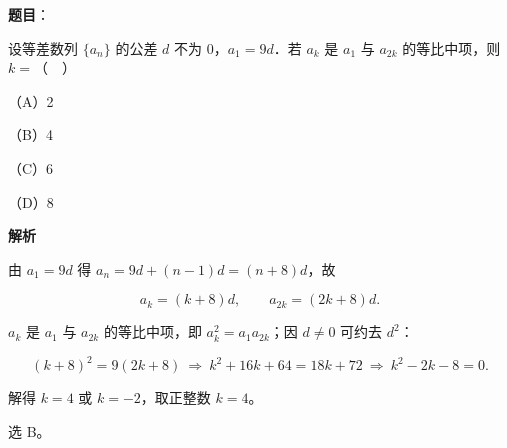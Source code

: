 \begin{answer}

\textbf{题目}：

设等差数列 $\{a_n\}$ 的公差 $d$ 不为 $0$，$a_1=9d$．若 $a_k$ 是 $a_1$ 与 $a_{2k}$ 的等比中项，则 $k=$（　）

（A）2

（B）4

（C）6

（D）8

\textbf{解析}

由 $a_1=9d$ 得 $a_n=9d+(n-1)d=(n+8)d$，故

\nopagebreak[4]
\[a_k=(k+8)d,\qquad a_{2k}=(2k+8)d .\]

$a_k$ 是 $a_1$ 与 $a_{2k}$ 的等比中项，即 $a_k^2=a_1a_{2k}$；因 $d\ne0$ 可约去 $d^2$：

\nopagebreak[4]
\[(k+8)^2=9(2k+8)\ \Longrightarrow\ k^2+16k+64=18k+72\ \Longrightarrow\ k^2-2k-8=0 .\]

解得 $k=4$ 或 $k=-2$，取正整数 $k=4$。

选 B。


\end{answer}
